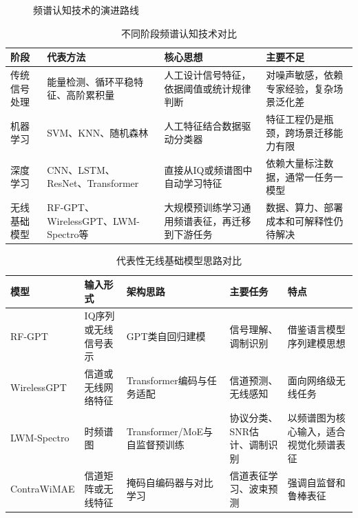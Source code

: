 \documentclass[UTF8,fontset=windows,zihao=-4]{ctexart}
\begin{document}
\begin{figure}[H]
\centering
{}
\caption{频谱认知技术的演进路线}
\label{fig:evolution}
\end{figure}

\begin{table}[H]
\centering
\caption{不同阶段频谱认知技术对比}
\label{tab:evolution}
\begin{tabularx}{\textwidth}{p{2.2cm}p{3.0cm}YY}
\toprule
阶段 & 代表方法 & 核心思想 & 主要不足 \\
\midrule
传统信号处理 & 能量检测、循环平稳特征、高阶累积量 & 人工设计信号特征，依据阈值或统计规律判断 & 对噪声敏感，依赖专家经验，复杂场景泛化差 \\
机器学习 & SVM、KNN、随机森林 & 人工特征结合数据驱动分类器 & 特征工程仍是瓶颈，跨场景迁移能力有限 \\
深度学习 & CNN、LSTM、ResNet、Transformer & 直接从IQ或频谱图中自动学习特征 & 依赖大量标注数据，通常一任务一模型 \\
无线基础模型 & RF-GPT、WirelessGPT、LWM-Spectro等 & 大规模预训练学习通用频谱表征，再迁移到下游任务 & 数据、算力、部署成本和可解释性仍待解决 \\
\bottomrule
\end{tabularx}
\end{table}

\begin{table}[H]
\centering
\footnotesize
\caption{代表性无线基础模型思路对比}
\label{tab:wfm}
\begin{tabularx}{\textwidth}{p{2.4cm}p{2.3cm}p{2.9cm}p{2.5cm}Y}
\toprule
模型 & 输入形式 & 架构思路 & 主要任务 & 特点 \\
\midrule
RF-GPT & IQ序列或无线信号表示 & GPT类自回归建模 & 信号理解、调制识别 & 借鉴语言模型序列建模思想 \\
WirelessGPT & 信道或无线网络特征 & Transformer编码与任务适配 & 信道预测、无线感知 & 面向网络级无线任务 \\
LWM-Spectro & 时频谱图 & Transformer/MoE与自监督预训练 & 协议分类、SNR估计、调制识别 & 以频谱图为核心输入，适合视觉化频谱表征 \\
ContraWiMAE & 信道矩阵或无线特征 & 掩码自编码器与对比学习 & 信道表征学习、波束预测 & 强调自监督和鲁棒表征 \\
\bottomrule
\end{tabularx}
\end{table}
\end{document}

